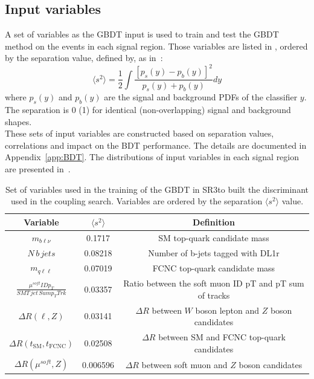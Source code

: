 \subsection {Input variables}
A set of variables as the GBDT input is used to train and test the GBDT method on the events in
each signal region. Those variables are listed in , ordered by the separation value, defined by, as in~\cite{TMVA}:
\begin{equation*}
\langle s^{2}\rangle = \frac{1}{2}\int \frac{[p_{s}(y)-p_{b}(y)]^{2}}{p_{s}(y)+p_{b}(y)}dy
\end{equation*}
where $p_{s}(y)$ and $p_{b}(y)$ are the signal and background PDFs of the classifier $y$. 
The separation is 0 (1) for identical (non-overlapping) signal and background shapes.\\
These sets of input variables are constructed based on separation values, correlations and impact on the BDT performance. The details are documented in Appendix~\ref{app:BDT}.  
The distributions of input variables in each signal region are presented in~.

\begin{table}[!htbp]
	\small
	\centering
	\begin{tabular}{ccc}
		\toprule
		Variable & $\langle s^{2}\rangle$  & Definition \\
		\midrule
		$m_{b\ell\nu}$  &  0.1717  &  SM top-quark candidate mass  \\
		$N\,b\,jets$  &  0.08218  &  Number of b-jets tagged with DL1r  \\
		$m_{q\ell\ell}$  &  0.07019  &  FCNC top-quark candidate mass  \\
		$\frac{\mu^{soft} ID p_{T}}{SMT\,jet\,Sum p_{T} Trk}$  &  0.03357  &  Ratio between the soft muon ID pT and pT sum of tracks  \\
		$\Delta R(\ell,Z)$  &  0.03141  &  $\Delta R$ between $W$ boson lepton and $Z$ boson candidates  \\
		$\Delta R(t_{\text{SM}},t_{\text{FCNC}})$  &  0.02508  &  $\Delta R$ between SM and FCNC top-quark candidates  \\
		$\Delta R(\mu^{soft},Z)$  &  0.006596  &  $\Delta R$ between soft muon and $Z$ boson candidates  \\
		\bottomrule
	\end{tabular}
	\caption{
	Set of variables used in the training of the GBDT in SR3\tZc to built the \Dthree discriminant used in the \tZc coupling search. Variables are ordered by the separation 	$\langle s^{2}\rangle$ value. }
	\label{tab:D3input}
\end{table}

